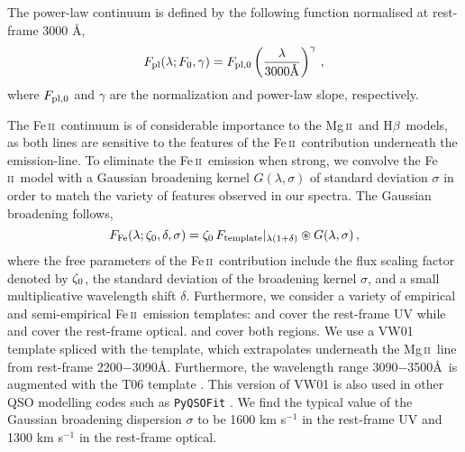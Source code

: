 \documentclass[fleqn,usenatbib]{mnras}
\newcommand{\mgii}{Mg\,\textsc{ii}}
\newcommand{\feii}{Fe\,\textsc{ii}}
\newcommand{\hbeta}{H\textsc{$\beta$}}
\begin{document}
The power-law continuum is defined by the following function normalised at rest-frame 3000 \AA, 
\begin{equation}
    F_{\rm{pl}}(\lambda; F_{\rm{0}}, \gamma) = F_{\rm{pl, 0}} \left(\frac{\lambda}{3000 \mbox{\normalfont\AA}}\right)^{\gamma}\,,
    \label{eq:pl-cont}
\end{equation}
where $F_{\rm{pl, 0}}$ and $\gamma$ are the normalization and power-law slope, respectively. 

The \feii\ continuum is of considerable importance to the \mgii\ and \hbeta\ models, as both lines are sensitive to the features of the \feii\ contribution underneath the emission-line. To eliminate the \feii\ emission when strong, we convolve the \feii\ model with a Gaussian broadening kernel $G(\lambda, \sigma)$ of standard deviation $\sigma$ in order to match the variety of features observed in our spectra. The Gaussian broadening follows,
\begin{equation}
    F_{\rm{Fe}}(\lambda; \zeta_{\rm{0}}, \delta, \sigma) = \zeta_{\rm{0}} \,  F_{\rm{template}}|_{\lambda(1+\delta)} \circledast G(\lambda, \sigma)\,,
\end{equation}
where the free parameters of the \feii\ contribution include the flux scaling factor denoted by $\zeta_{\rm{0}}$, the standard deviation of the broadening kernel $\sigma$, and a small multiplicative wavelength shift $\delta$. Furthermore, we consider a variety of empirical and semi-empirical \feii\ emission templates: \citet[][VW01]{Vestergaard_2001} and \citet[][M16]{Mejia-Restrepo_2016} cover the rest-frame UV while \citet[][BG92]{Boroson_Greene_1992} and \citet[][P22]{Park_2022} cover the rest-frame optical. \citet[][BV08]{Bruhweiler_Verner_2008} and \citet[][T06]{Tsuzuki_2006} cover both regions. We use a VW01 template spliced with the \citet{Salviander_2007} template, which extrapolates underneath the \mgii\ line from rest-frame 2200$-$3090\AA. Furthermore, the wavelength range 3090$-$3500\AA\ is augmented with the T06 template \citep{Shen_2012}. This version of VW01 is also used in other QSO modelling codes such as \texttt{PyQSOFit} \citep{Guo_2018}. We find the typical value of the Gaussian broadening dispersion $\sigma$ to be 1600 km s$^{-1}$ in the rest-frame UV and 1300 km s$^{-1}$ in the rest-frame optical. 
\end{document}
